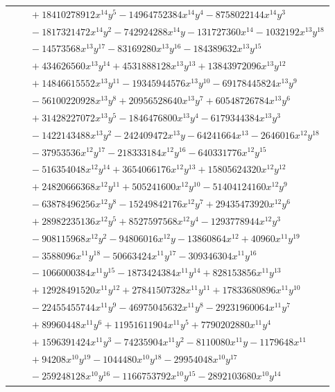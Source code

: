 \documentclass[11pt]{article}
\begin{document}
\begin{longtable}{@{}ll@{}}
 & $\quad +18410278912x^{14}y^{5}-14964752384x^{14}y^{4}-8758022144x^{14}y^{3}$\\
 & $\quad -1817321472x^{14}y^{2}-742924288x^{14}y-131727360x^{14}-1032192x^{13}y^{18}$\\
 & $\quad -14573568x^{13}y^{17}-83169280x^{13}y^{16}-184389632x^{13}y^{15}$\\
 & $\quad +434626560x^{13}y^{14}+4531888128x^{13}y^{13}+13843972096x^{13}y^{12}$\\
 & $\quad +14846615552x^{13}y^{11}-19345944576x^{13}y^{10}-69178445824x^{13}y^{9}$\\
 & $\quad -56100220928x^{13}y^{8}+20956528640x^{13}y^{7}+60548726784x^{13}y^{6}$\\
 & $\quad +31428227072x^{13}y^{5}-1846476800x^{13}y^{4}-6179344384x^{13}y^{3}$\\
 & $\quad -1422143488x^{13}y^{2}-242409472x^{13}y-64241664x^{13}-2646016x^{12}y^{18}$\\
 & $\quad -37953536x^{12}y^{17}-218333184x^{12}y^{16}-640331776x^{12}y^{15}$\\
 & $\quad -516354048x^{12}y^{14}+3654066176x^{12}y^{13}+15805624320x^{12}y^{12}$\\
 & $\quad +24820666368x^{12}y^{11}+505241600x^{12}y^{10}-51404124160x^{12}y^{9}$\\
 & $\quad -63878496256x^{12}y^{8}-15249842176x^{12}y^{7}+29435473920x^{12}y^{6}$\\
 & $\quad +28982235136x^{12}y^{5}+8527597568x^{12}y^{4}-1293778944x^{12}y^{3}$\\
 & $\quad -908115968x^{12}y^{2}-94806016x^{12}y-13860864x^{12}+40960x^{11}y^{19}$\\
 & $\quad -3588096x^{11}y^{18}-50663424x^{11}y^{17}-309346304x^{11}y^{16}$\\
 & $\quad -1066000384x^{11}y^{15}-1873424384x^{11}y^{14}+828153856x^{11}y^{13}$\\
 & $\quad +12928491520x^{11}y^{12}+27841507328x^{11}y^{11}+17833680896x^{11}y^{10}$\\
 & $\quad -22455455744x^{11}y^{9}-46975045632x^{11}y^{8}-29231960064x^{11}y^{7}$\\
 & $\quad +89960448x^{11}y^{6}+11951611904x^{11}y^{5}+7790202880x^{11}y^{4}$\\
 & $\quad +1596391424x^{11}y^{3}-74235904x^{11}y^{2}-8110080x^{11}y-1179648x^{11}$\\
 & $\quad +94208x^{10}y^{19}-1044480x^{10}y^{18}-29954048x^{10}y^{17}$\\
 & $\quad -259248128x^{10}y^{16}-1166753792x^{10}y^{15}-2892103680x^{10}y^{14}$\\

\end{longtable}
\end{document}
